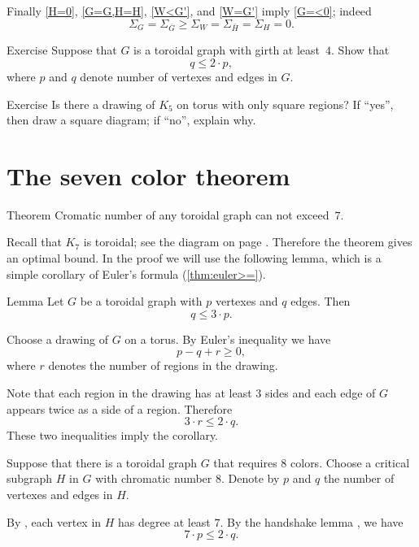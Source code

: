 Finally \ref{H=0}, \ref{G=G,H=H}, \ref{W<G'}, and \ref{W=G'} imply \ref{G=<0};
indeed
\[\Sigma_G=\Sigma_{\bar G}\ge \Sigma_W=\Sigma_{\bar H}=\Sigma_H=0.\]
\qedsf


\begin{thm}{Exercise}
Suppose that $G$ is a toroidal graph with girth at least~$4$.
Show that 
\[q\le 2\cdot p,\]
where $p$ and $q$ denote number of vertexes and edges in $G$.
\end{thm}

\begin{thm}{Exercise}
Is there a drawing of $K_5$ on torus with only square regions?
If ``yes'', then draw a square diagram; if ``no'', explain why.
\end{thm}

\section*{The seven color theorem}

\begin{thm}{Theorem}\label{thm:7-colors}
Cromatic number of any toroidal graph can not exceed~$7$.
\end{thm}

Recall that $K_7$ is toroidal; see the diagram on page \pageref{K5-toroidal}.
Therefore the theorem gives an optimal bound.
In the proof we will use the following lemma, which is a simple corollary of Euler's formula (\ref{thm:euler>=}).

\begin{thm}{Lemma}\label{cor:q=<3p}
Let $G$ be a toroidal graph with $p$ vertexes and $q$ edges.
Then 
\[q\le 3\cdot p.\]

\end{thm}

Choose a drawing of $G$ on a torus.
By Euler's inequality we have
\[p-q+r\ge 0,\]
where $r$ denotes the number of regions in the drawing.

Note that each region in the drawing has at least $3$ sides
and each edge of $G$ appears twice as a side of a region.
Therefore 
\[3\cdot r\le 2\cdot q.\]
These two inequalities imply the corollary.
\qeds


Suppose that there is a toroidal graph $G$ that requires $8$ colors.
Choose a critical subgraph $H$ in $G$ with chromatic number 8.
Denote by $p$ and $q$ the number of vertexes and edges in $H$.

By \cite[Theorem 2.1.3]{hartsfield-ringel}, each vertex in $H$ has degree at least $7$.
By the handshake lemma \cite[Theorem 1.1.1]{hartsfield-ringel}, we have 
\[7\cdot p\le 2\cdot q.\]

